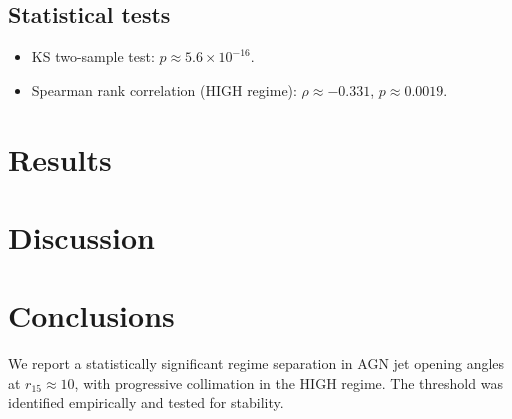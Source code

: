 \documentclass[usenatbib]{mnras}
\begin{document}
\subsection{Statistical tests}

\begin{itemize}
  \item KS two-sample test: $p \approx 5.6 \times 10^{-16}$.
  \item Spearman rank correlation (HIGH regime): $\rho \approx -0.331$, $p \approx 0.0019$.
\end{itemize}

\section{Results}
\label{sec:results}


\section{Discussion}
\label{sec:discussion}


\section{Conclusions}
\label{sec:conclusions}

We report a statistically significant regime separation in AGN jet opening angles
at $r_{15} \approx 10$, with progressive collimation in the HIGH regime.
The threshold was identified empirically and tested for stability.



\end{document}
